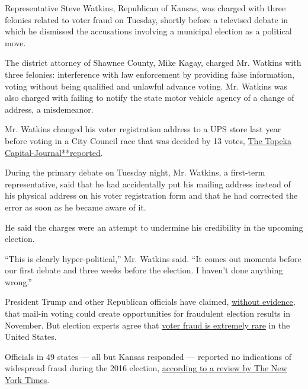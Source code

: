Representative Steve Watkins, Republican of Kansas, was charged with
three felonies related to voter fraud on Tuesday, shortly before a
televised debate in which he dismissed the accusations involving a
municipal election as a political move.

The district attorney of Shawnee County, Mike Kagay, charged Mr. Watkins
with three felonies: interference with law enforcement by providing
false information, voting without being qualified and unlawful advance
voting. Mr. Watkins was also charged with failing to notify the state
motor vehicle agency of a change of address, a misdemeanor.

Mr. Watkins changed his voter registration address to a UPS store last
year before voting in a City Council race that was decided by 13 votes,
\href{https://www.cjonline.com/news/20191203/us-rep-steve-watkins-tangled-in-voter-fraud-perjury-allegations-for-listing-ups-store-as-residence}{The
Topeka
Capital-Journal}\href{https://www.cjonline.com/news/20191203/us-rep-steve-watkins-tangled-in-voter-fraud-perjury-allegations-for-listing-ups-store-as-residence}{**}\href{https://www.cjonline.com/news/20191203/us-rep-steve-watkins-tangled-in-voter-fraud-perjury-allegations-for-listing-ups-store-as-residence}{reported}.

During the primary debate on Tuesday night, Mr. Watkins, a first-term
representative, said that he had accidentally put his mailing address
instead of his physical address on his voter registration form and that
he had corrected the error as soon as he became aware of it.

He said the charges were an attempt to undermine his credibility in the
upcoming election.

``This is clearly hyper-political,'' Mr. Watkins said. ``It comes out
moments before our first debate and three weeks before the election. I
haven't done anything wrong.''

President Trump and other Republican officials have claimed,
\href{https://www.nytimes3xbfgragh.onion/article/mail-in-vote-fraud-ballot.html}{without
evidence}, that mail-in voting could create opportunities for fraudulent
election results in November. But election experts agree that
\href{https://scholars.org/sites/scholars/files/ssn_key_findings_minnite_on_the_myth_of_voter_fraud.pdf}{voter
fraud is extremely rare} in the United States.

Officials in 49 states --- all but Kansas responded --- reported no
indications of widespread fraud during the 2016 election,
\href{https://www.nytimes3xbfgragh.onion/2016/12/18/us/voter-fraud.html}{according
to a review by The New York Times}.

